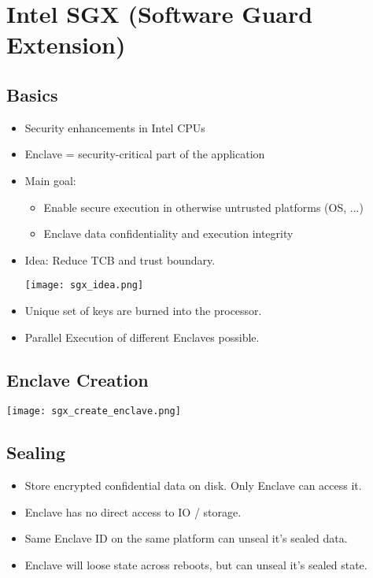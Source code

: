 
\section{Intel SGX (Software Guard Extension)}
\subsection{Basics}
\begin{itemize}
  \item Security enhancements in Intel CPUs
  \item Enclave = security-critical part of the application
  \item Main goal:
    \begin{itemize}
      \item Enable secure execution in otherwise untrusted platforms (OS, ...)
      \item Enclave data confidentiality and execution integrity
    \end{itemize}
  \item Idea: Reduce TCB and trust boundary.
    \begin{center}
      \texttt{[image: sgx\_idea.png]}
    \end{center}
  \item Unique set of keys are burned into the processor.
  \item Parallel Execution of different Enclaves possible.
\end{itemize}

\subsection{Enclave Creation}
\begin{center}
  \texttt{[image: sgx\_create\_enclave.png]}
\end{center}

\subsection{Sealing}
\begin{itemize}
  \item Store encrypted confidential data on disk. Only Enclave can access it.
  \item Enclave has no direct access to IO / storage.
  \item Same Enclave ID on the same platform can unseal it's sealed data.
  \item Enclave will loose state across reboots, but can unseal it's sealed
    state.
\end{itemize}


